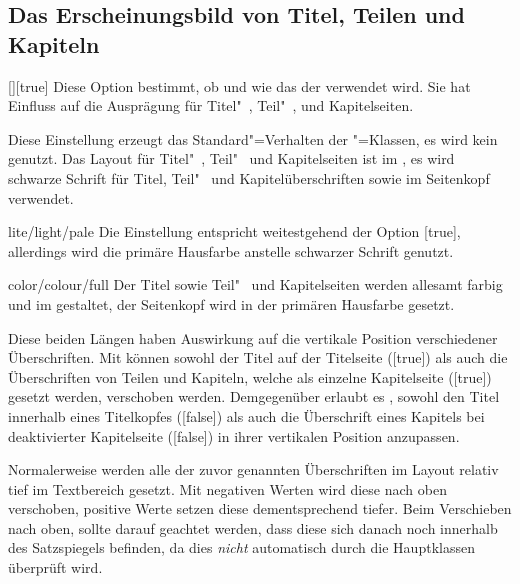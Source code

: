 \subsection{Das Erscheinungsbild von Titel, Teilen und Kapiteln}
\begin{Declaration}{[\PSet]}[true]
\printdeclarationlist%
%
%
Diese Option bestimmt, ob und wie das \CD der \TnUD verwendet wird. Sie hat
Einfluss auf die Ausprägung für Titel"~, Teil"~, und Kapitelseiten.
%
\begin{values}
\itemfalse
  Diese Einstellung erzeugt das Standard"=Verhalten der \KOMAScript"=Klassen, 
  es wird kein \CD genutzt.
  Das Layout für Titel"~, Teil"~ und Kapitelseiten ist im \CD, es wird 
  schwarze Schrift für Titel, Teil"~ und Kapitelüberschriften sowie im 
  Seitenkopf verwendet.
\item[lite/light/pale]
  Die Einstellung entspricht weitestgehend der Option [true], 
  allerdings wird die primäre Hausfarbe  anstelle schwarzer 
  Schrift genutzt.
\item[color/colour/full]
  Der Titel sowie Teil"~ und Kapitelseiten werden allesamt farbig und im \CD 
  gestaltet, der Seitenkopf wird in der primären Hausfarbe  
  gesetzt.
\end{values}
\end{Declaration}

\begin{Declaration}[v2.02]{}
\begin{Declaration}[v2.02]{}
\printdeclarationlist%
%
%
Diese beiden Längen haben Auswirkung auf die vertikale Position verschiedener
Überschriften. Mit  können sowohl der Titel auf der 
Titelseite ([true]) als auch die Überschriften von Teilen und 
Kapiteln, welche als einzelne Kapitelseite ([true]) gesetzt 
werden, verschoben werden. Demgegenüber erlaubt es , 
sowohl den Titel innerhalb eines Titelkopfes ([false]) als 
auch die Überschrift eines Kapitels bei deaktivierter Kapitelseite 
([false]) in ihrer vertikalen Position anzupassen.

Normalerweise werden alle der zuvor genannten Überschriften im Layout relativ 
tief im Textbereich gesetzt. Mit negativen Werten wird diese nach oben 
verschoben, positive Werte setzen diese dementsprechend tiefer. Beim 
Verschieben nach oben, sollte darauf geachtet werden, dass diese sich danach 
noch innerhalb des Satzspiegels befinden, da dies \emph{nicht} automatisch 
durch die Hauptklassen überprüft wird.
\end{Declaration}
\end{Declaration}

